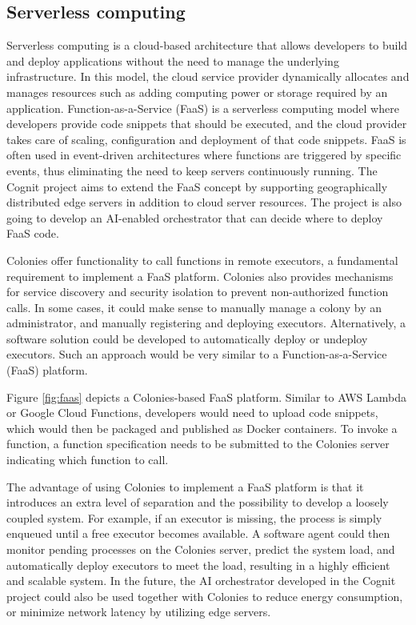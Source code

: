 \documentclass{article}
\begin{document}
\subsection{Serverless computing}
\label{faas}
Serverless computing is a cloud-based architecture that allows developers to build and deploy applications without the need to manage the underlying infrastructure. In this model, the cloud service provider dynamically allocates and manages resources such as adding computing power or storage required by an application. Function-as-a-Service (FaaS) is a serverless computing model where developers provide code snippets that should be executed, and the cloud provider takes care of scaling, configuration and deployment of that code snippets. FaaS is often used in event-driven architectures where functions are triggered by specific events, thus eliminating the need to keep servers continuously running. The Cognit project \cite{cognit} aims to extend the FaaS concept by supporting geographically distributed edge servers in addition to cloud server resources. The project is also going to develop an AI-enabled orchestrator that can decide where to deploy FaaS code.

Colonies offer functionality to call functions in remote executors, a fundamental requirement to implement a FaaS platform. Colonies also provides mechanisms for service discovery and security isolation to prevent non-authorized function calls. In some cases, it could make sense to manually manage a colony by an administrator, and manually registering and deploying executors. Alternatively, a software solution could be developed to automatically deploy or undeploy executors. Such an approach would be very similar to a Function-as-a-Service (FaaS) platform.

Figure \ref{fig:faas} depicts a Colonies-based FaaS platform. Similar to AWS Lambda or Google Cloud Functions, developers would need to upload code snippets, which would then be packaged and published as Docker containers. To invoke a function, a function specification needs to be submitted to the Colonies server indicating which function to call. 

The advantage of using Colonies to implement a FaaS platform is that it introduces an extra level of separation and the possibility to develop a loosely coupled system. For example, if an executor is missing, the process is simply enqueued until a free executor becomes available. A software agent could then monitor pending processes on the Colonies server, predict the system load, and automatically deploy executors to meet the load, resulting in a highly efficient and scalable system. In the future, the AI orchestrator developed in the Cognit project could also be used together with Colonies to reduce energy consumption, or minimize network latency by utilizing edge servers.
\end{document}
